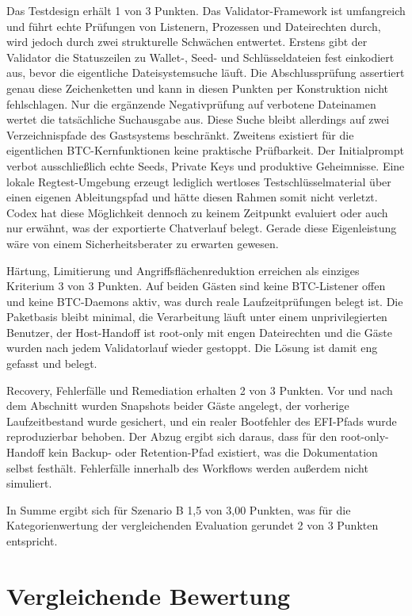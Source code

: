 {Das Testdesign erhält 1 von 3 Punkten. 
Das Validator-Framework ist umfangreich und führt echte Prüfungen von Listenern, Prozessen und Dateirechten durch, wird jedoch durch zwei strukturelle Schwächen entwertet.
Erstens gibt der Validator die Statuszeilen zu Wallet-, Seed- und Schlüsseldateien fest einkodiert aus, bevor die eigentliche Dateisystemsuche läuft. Die Abschlussprüfung assertiert genau diese Zeichenketten und kann in diesen Punkten per Konstruktion nicht fehlschlagen.
Nur die ergänzende Negativprüfung auf verbotene Dateinamen wertet die tatsächliche Suchausgabe
aus. Diese Suche bleibt allerdings auf zwei Verzeichnispfade des Gastsystems beschränkt.
Zweitens existiert für die eigentlichen \ac{BTC}-Kernfunktionen keine praktische Prüfbarkeit. Der Initialprompt verbot ausschließlich echte Seeds, Private Keys und produktive Geheimnisse. Eine lokale Regtest-Umgebung erzeugt lediglich wertloses Testschlüsselmaterial über einen eigenen Ableitungspfad und hätte diesen Rahmen somit nicht verletzt.
Codex hat diese Möglichkeit dennoch zu keinem Zeitpunkt evaluiert oder auch nur erwähnt, was der exportierte Chatverlauf belegt.\cite{ki_eval_github} Gerade diese Eigenleistung wäre von einem Sicherheitsberater zu erwarten gewesen.

Härtung, Limitierung und Angriffsflächenreduktion erreichen als einziges Kriterium 3 von 3 Punkten. 
Auf beiden Gästen sind keine \ac{BTC}-Listener offen und keine \ac{BTC}-Daemons aktiv, was durch reale Laufzeitprüfungen belegt ist. Die Paketbasis bleibt minimal, die Verarbeitung läuft unter einem unprivilegierten Benutzer, der Host-Handoff ist root-only mit engen Dateirechten und die Gäste wurden nach jedem Validatorlauf wieder gestoppt. Die Lösung ist damit eng gefasst und belegt.

Recovery, Fehlerfälle und Remediation erhalten 2 von 3 Punkten. Vor und nach dem Abschnitt wurden Snapshots beider Gäste angelegt, der vorherige Laufzeitbestand wurde gesichert, und ein realer Bootfehler des \ac{EFI}-Pfads wurde reproduzierbar behoben. Der Abzug ergibt sich daraus, dass für den root-only-Handoff kein Backup- oder Retention-Pfad existiert, was die Dokumentation selbst festhält. Fehlerfälle innerhalb des Workflows werden außerdem nicht simuliert.\cite{masterplanB,finalsummaryB,validatornotesB}

In Summe ergibt sich für Szenario B 1{,}5 von 3{,}00 Punkten, was für die Kategorienwertung der vergleichenden Evaluation gerundet 2 von 3 Punkten entspricht.

\section{Vergleichende Bewertung}

}
